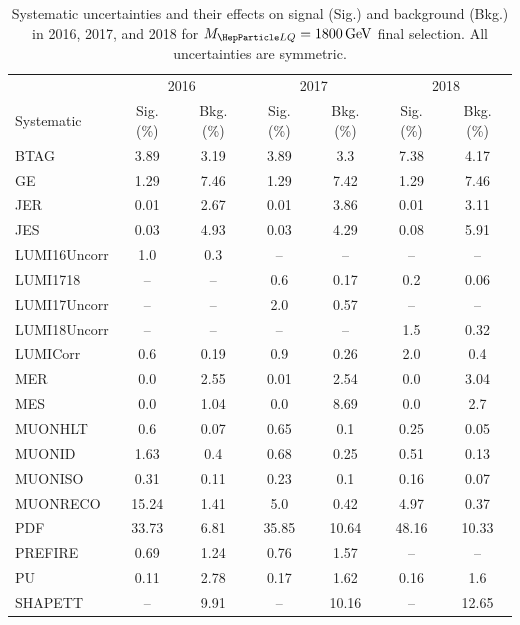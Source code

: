 \begin{table}[H]
	\begin{center}
        \begin{footnotesize}
			\caption{Systematic uncertainties and their effects on signal (Sig.) and background (Bkg.) in 2016, 2017, and 2018 for $\MLQ = \SI{1800}{GeV}$ final selection. All uncertainties are symmetric.}
			\begin{tabular}{lcccccc} \hline \hline
				& \multicolumn{2}{c}{2016} & \multicolumn{2}{c}{2017} & \multicolumn{2}{c}{2018} \\
				Systematic & Sig. (\%) & Bkg. (\%) & Sig. (\%) & Bkg. (\%) & Sig. (\%) & Bkg. (\%) \\ \hline
				BTAG &  3.89  &  3.19 &  3.89  &  3.3 &  7.38  &  4.17 \\
				GE &  1.29  &  7.46 &  1.29  &  7.42 &  1.29  &  7.46 \\
				JER &  0.01  &  2.67 &  0.01  &  3.86 &  0.01  &  3.11 \\
				JES &  0.03  &  4.93 &  0.03  &  4.29 &  0.08  &  5.91 \\
				LUMI16Uncorr &  1.0  &  0.3 & -- & -- & -- & -- \\
				LUMI1718 & -- & -- &  0.6  &  0.17 &  0.2  &  0.06 \\
				LUMI17Uncorr & -- & -- &  2.0  &  0.57 & -- & -- \\
				LUMI18Uncorr & -- & -- & -- & -- &  1.5  &  0.32 \\
				LUMICorr &  0.6  &  0.19 &  0.9  &  0.26 &  2.0  &  0.4 \\
				MER &  0.0  &  2.55 &  0.01  &  2.54 &  0.0  &  3.04 \\
				MES &  0.0  &  1.04 &  0.0  &  8.69 &  0.0  &  2.7 \\
				MUONHLT &  0.6  &  0.07 &  0.65  &  0.1 &  0.25  &  0.05 \\
				MUONID &  1.63  &  0.4 &  0.68  &  0.25 &  0.51  &  0.13 \\
				MUONISO &  0.31  &  0.11 &  0.23  &  0.1 &  0.16  &  0.07 \\
				MUONRECO &  15.24  &  1.41 &  5.0  &  0.42 &  4.97  &  0.37 \\
				PDF &  33.73  &  6.81 &  35.85  &  10.64 &  48.16  &  10.33 \\
				PREFIRE &  0.69  &  1.24 &  0.76  &  1.57 & -- & -- \\
				PU &  0.11  &  2.78 &  0.17  &  1.62 &  0.16  &  1.6 \\
				SHAPETT & -- &  9.91 & -- &  10.16 & -- &  12.65 \\

\end{tabular}
\end{footnotesize}
\end{center}
\end{table}
